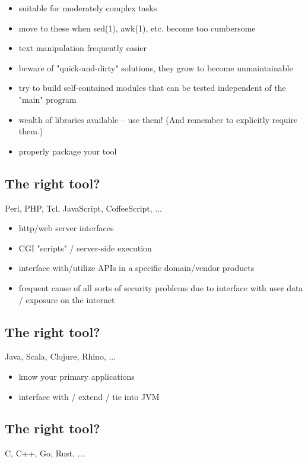 \documentclass[xga]{xdvislides}
\begin{document}
\begin{itemize}
	\item suitable for moderately complex tasks
	\item move to these when sed(1), awk(1), etc. become too cumbersome
	\item text manipulation frequently easier
	\item beware of "quick-and-dirty" solutions, they grow to become
		unmaintainable
	\item try to build self-contained modules that can be tested independent of
		the "main" program
	\item wealth of libraries available -- use them! (And remember to explicitly
		require them.)
	\item properly package your tool
\end{itemize}

\subsection{The right tool?}
Perl, PHP, Tcl, JavaScript, CoffeeScript, ... \\

\begin{itemize}
	\item http/web server interfaces
	\item CGI "scripts" / server-side execution
	\item interface with/utilize APIs in a specific domain/vendor products
	\item frequent cause of all sorts of security problems due to interface with
		user data / exposure on the internet
\end{itemize}

\subsection{The right tool?}
Java, Scala, Clojure, Rhino, ... \\

\begin{itemize}
	\item know your primary applications
	\item interface with / extend / tie into JVM
\end{itemize}

\subsection{The right tool?}
C, C++, Go, Rust, ... \\
\end{document}
